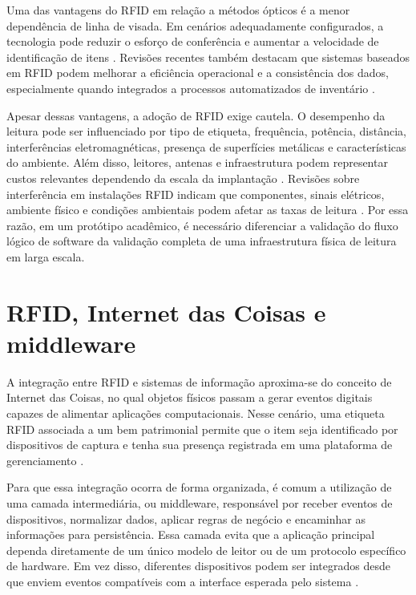 Uma das vantagens do RFID em relação a métodos ópticos é a menor dependência de linha de visada. Em cenários adequadamente configurados, a tecnologia pode reduzir o esforço de conferência e aumentar a velocidade de identificação de itens \cite{alwadi2017,ting2013}. Revisões recentes também destacam que sistemas baseados em RFID podem melhorar a eficiência operacional e a consistência dos dados, especialmente quando integrados a processos automatizados de inventário \cite{budiyanto2024,mashayekhy2022}.

Apesar dessas vantagens, a adoção de RFID exige cautela. O desempenho da leitura pode ser influenciado por tipo de etiqueta, frequência, potência, distância, interferências eletromagnéticas, presença de superfícies metálicas e características do ambiente. Além disso, leitores, antenas e infraestrutura podem representar custos relevantes dependendo da escala da implantação \cite{budiyanto2024,ting2013}. Revisões sobre interferência em instalações RFID indicam que componentes, sinais elétricos, ambiente físico e condições ambientais podem afetar as taxas de leitura \cite{knapp2022}. Por essa razão, em um protótipo acadêmico, é necessário diferenciar a validação do fluxo lógico de software da validação completa de uma infraestrutura física de leitura em larga escala.

\section{RFID, Internet das Coisas e middleware}

A integração entre RFID e sistemas de informação aproxima-se do conceito de Internet das Coisas, no qual objetos físicos passam a gerar eventos digitais capazes de alimentar aplicações computacionais. Nesse cenário, uma etiqueta RFID associada a um bem patrimonial permite que o item seja identificado por dispositivos de captura e tenha sua presença registrada em uma plataforma de gerenciamento \cite{abijaude2017}.

Para que essa integração ocorra de forma organizada, é comum a utilização de uma camada intermediária, ou middleware, responsável por receber eventos de dispositivos, normalizar dados, aplicar regras de negócio e encaminhar as informações para persistência. Essa camada evita que a aplicação principal dependa diretamente de um único modelo de leitor ou de um protocolo específico de hardware. Em vez disso, diferentes dispositivos podem ser integrados desde que enviem eventos compatíveis com a interface esperada pelo sistema \cite{alwadi2017,razzaque2015}.

